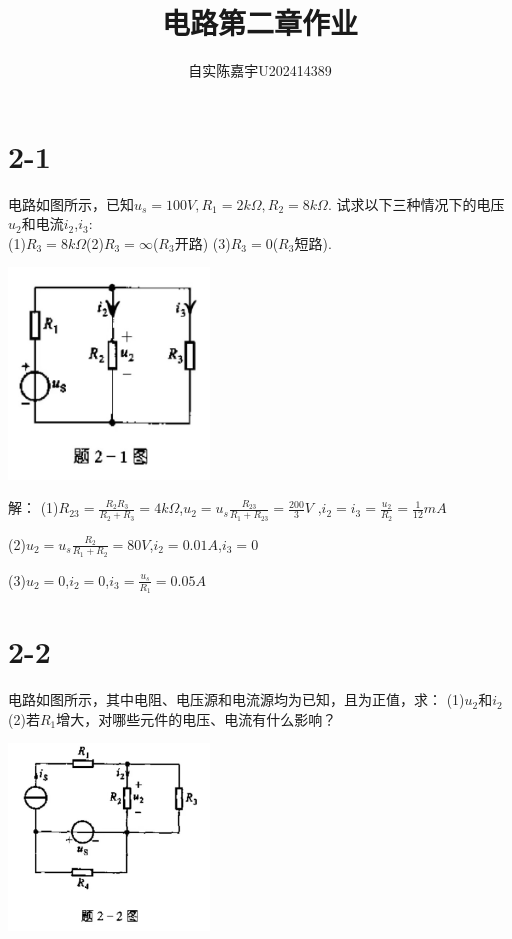 \documentclass{article}
\title{电路第二章作业}
\author{自实陈嘉宇U202414389}
\date{}
\begin{document}
\maketitle
\section*{2-1}电路如图所示，已知$u_s=100V,R_1=2k\Omega,R_2=8k\Omega$.
试求以下三种情况下的电压$u_2$和电流$i_2$,$i_3$:\\
(1)$R_3=8k\Omega$\quad(2)$R_3=\infty$($R_3$开路)
(3)$R_3=0$($R_3$短路).\\
\begin{center}
\includegraphics[width=0.4\textwidth,height=0.2\textheight]{2-1.jpg}
\end{center}

\noindent 解：
(1)$R_\text{23}=\frac{R_2R_3}{R_2+R_3}=4k\Omega$,$u_2=u_s\frac{R_\text{23}}{R_1+R_\text{23}}=\frac{200}{3}V$
,$i_2=i_3=\frac{u_2}{R_2}=\frac{1}{12}mA$

(2)$u_2=u_s\frac{R_2}{R_1+R_2}=80V$,$i_2=0.01A$,$i_3=0$

(3)$u_2=0$,$i_2=0$,$i_3=\frac{u_s}{R_1}=0.05A$
\section*{2-2}电路如图所示，其中电阻、电压源和电流源均为已知，且为正值，求：
(1)$u_2$和$i_2$\quad (2)若$R_1$增大，对哪些元件的电压、电流有什么影响？\\
\begin{center}
\includegraphics[width=0.4\textwidth,height=0.2\textheight]{2-2.jpg}
\end{center}
\end{document}
